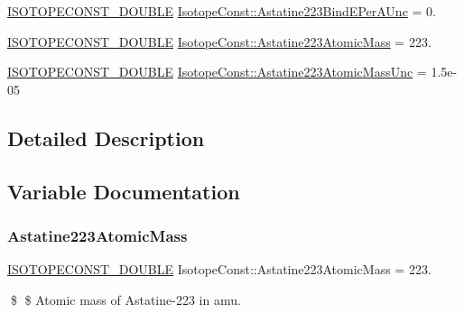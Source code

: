 \begin{DoxyCompactItemize}
\mbox{\hyperlink{group___isotope_const-_macros_ga8f45a7272ce02c0b4c65c44636ed719a}{I\+S\+O\+T\+O\+P\+E\+C\+O\+N\+S\+T\+\_\+\+D\+O\+U\+B\+LE}} \mbox{\hyperlink{group___isotope_const-_astatine-_at223_ga9c7086b2c4ae74f8a2e17b29c93db723}{Isotope\+Const\+::\+Astatine223\+Bind\+E\+Per\+A\+Unc}} = 0.
\item 
\mbox{\hyperlink{group___isotope_const-_macros_ga8f45a7272ce02c0b4c65c44636ed719a}{I\+S\+O\+T\+O\+P\+E\+C\+O\+N\+S\+T\+\_\+\+D\+O\+U\+B\+LE}} \mbox{\hyperlink{group___isotope_const-_astatine-_at223_ga473a64ceed58e80e1c7ccaee1e03a3ca}{Isotope\+Const\+::\+Astatine223\+Atomic\+Mass}} = 223.
\item 
\mbox{\hyperlink{group___isotope_const-_macros_ga8f45a7272ce02c0b4c65c44636ed719a}{I\+S\+O\+T\+O\+P\+E\+C\+O\+N\+S\+T\+\_\+\+D\+O\+U\+B\+LE}} \mbox{\hyperlink{group___isotope_const-_astatine-_at223_ga1e6df6e84bf3312ca099f915b3a15388}{Isotope\+Const\+::\+Astatine223\+Atomic\+Mass\+Unc}} = 1.\+5e-\/05
\end{DoxyCompactItemize}


\subsection{Detailed Description}


\subsection{Variable Documentation}
\mbox{\label{group___isotope_const-_astatine-_at223_ga473a64ceed58e80e1c7ccaee1e03a3ca}} 
\subsubsection{\texorpdfstring{Astatine223\+Atomic\+Mass}{Astatine223AtomicMass}}
{\footnotesize\ttfamily \mbox{\hyperlink{group___isotope_const-_macros_ga8f45a7272ce02c0b4c65c44636ed719a}{I\+S\+O\+T\+O\+P\+E\+C\+O\+N\+S\+T\+\_\+\+D\+O\+U\+B\+LE}} Isotope\+Const\+::\+Astatine223\+Atomic\+Mass = 223.}

\$ \$ Atomic mass of Astatine-\/223 in amu. \mbox{\label{group___isotope_const-_astatine-_at223_ga1e6df6e84bf3312ca099f915b3a15388}} 

